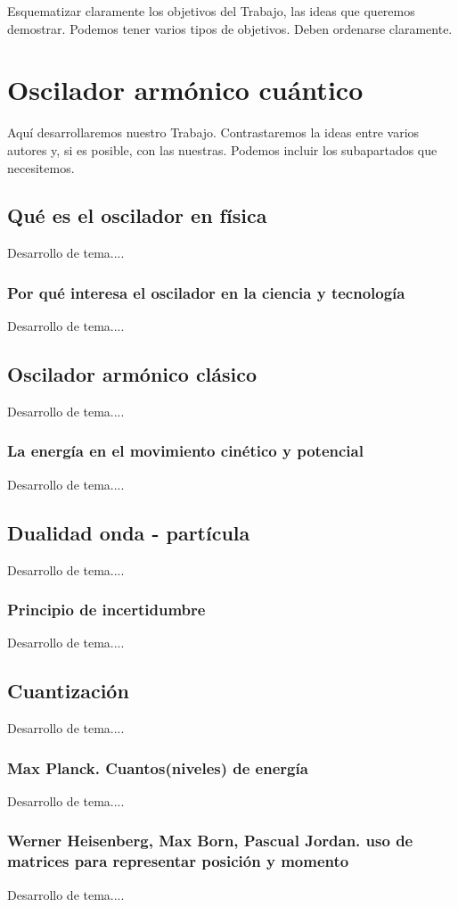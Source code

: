 \documentclass[11pt,a4paper,spanish]{book}
\begin{document}
Esquematizar claramente los objetivos del Trabajo, las ideas que queremos demostrar. Podemos tener varios tipos de objetivos. Deben ordenarse claramente.

\chapter{Oscilador armónico cuántico}

Aquí desarrollaremos nuestro Trabajo. Contrastaremos la ideas entre varios autores y, si es posible, con las nuestras. Podemos incluir los subapartados que necesitemos.


\section{Qué es el oscilador en física}
Desarrollo de tema....
\subsection{Por qué interesa el oscilador en la ciencia y tecnología}
Desarrollo de tema....


\section{Oscilador armónico clásico}
Desarrollo de tema....
\subsection{La energía en el movimiento cinético y potencial}
Desarrollo de tema....

\section{Dualidad onda - partícula}
Desarrollo de tema....
\subsection{Principio de incertidumbre}
Desarrollo de tema....

\section{Cuantización}
Desarrollo de tema....
\subsection{Max Planck. Cuantos(niveles) de energía}
Desarrollo de tema....
\subsection{Werner Heisenberg, Max Born, Pascual Jordan.  uso de matrices para representar posición y momento}
Desarrollo de tema....
\end{document}
